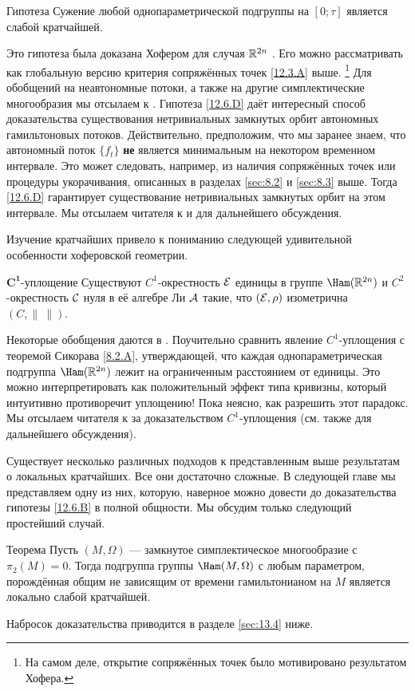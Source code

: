 \begin{thm}{Гипотеза}\label{12.6.D}
Сужение любой однопараметрической подгруппы на $[0;\tau]$ является слабой кратчайшей.
\end{thm}

Это гипотеза была доказана Хофером для случая $\mathbb{R}^{2n}$ \cite{H2}.
Его можно рассматривать как глобальную версию критерия сопряжённых точек \ref{12.3.A} выше.%
\footnote{На самом деле, открытие сопряжённых точек было мотивировано результатом Хофера.} 
Для обобщений на неавтономные потоки, а также на другие симплектические многообразия мы отсылаем к \cite{BP1, Si1,LM2,Sch3,MSl}.
Гипотеза \ref{12.6.D} даёт интересный способ доказательства существования нетривиальных замкнутых орбит автономных гамильтоновых потоков.
Действительно, предположим, что мы заранее знаем, что автономный поток $\{f_t\}$ \textbf{не} является минимальным на некотором временном интервале.
Это может следовать, например, из наличия сопряжённых точек или процедуры укорачивания, описанных в разделах \ref{sec:8.2} и \ref{sec:8.3} выше.
Тогда \ref{12.6.D} гарантирует существование нетривиальных замкнутых орбит на этом интервале.
Мы отсылаем читателя к \cite{LM2} и \cite{P8} для дальнейшего обсуждения.

Изучение кратчайших привело к пониманию следующей удивительной особенности хоферовской геометрии.

\begin{thm}[\cite{BP1}.]{$\bm{C^1}$-уплощение}
\label{12.6.E}
Существуют $C^1$-окрестность $\mathcal{E}$ единицы в группе $\Ham(\RR^{2n})$ и $C^2$-окрестность $\mathcal{C}$ нуля в её алгебре Ли $\mathcal{A}$ такие, что $(\mathcal{E}, \rho)$ изометрична $(C, \|\ \|)$.
\end{thm}

Некоторые обобщения даются в \cite{LM2}.
Поучительно сравнить явление $C^1$-уплощения с теоремой Сикорава \ref{8.2.A}, утверждающей, что каждая однопараметрическая подгруппа $\Ham(\RR^{2n})$ лежит на ограниченным расстоянием от единицы.
Это можно интерпретировать как положительный эффект типа кривизны, который интуитивно противоречит уплощению!
Пока неясно, как разрешить этот парадокс.
Мы отсылаем читателя к \cite{BP1,HZ} за доказательством $C^1$-уплощения (см. также \cite{P8} для дальнейшего обсуждения).

Существует несколько различных подходов к представленным выше результатам о локальных кратчайших.
Все они достаточно сложные.
В следующей главе мы представляем одну из них, которую, наверное можно довести до доказательства гипотезы \ref{12.6.B} в полной общности.
Мы обсудим только следующий простейший случай.

\begin{thm}{Теорема}\label{12.6.F}
Пусть $(M, \Omega)$ --- замкнутое симплектическое многообразие с $\pi_2(M) = 0$.
Тогда подгруппа группы $\Ham(M, \Omega)$ с любым параметром, порождённая общим не зависящим от времени гамильтонианом на $M$ является локально слабой кратчайшей.
\end{thm}

Набросок доказательства приводится в разделе \ref{sec:13.4} ниже.
